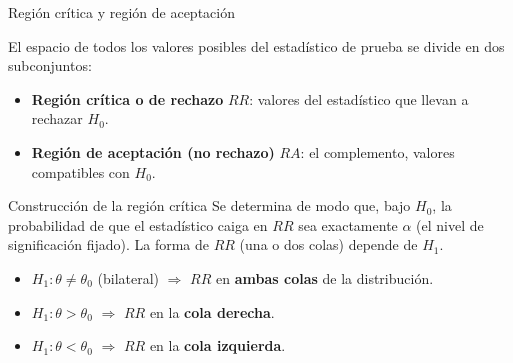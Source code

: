\documentclass[aspectratio=169,11pt]{beamer}
\begin{document}
\begin{frame}{Región crítica y región de aceptación}
\begin{definition}
El espacio de todos los valores posibles del estadístico de prueba se divide en dos subconjuntos:
\begin{itemize}
\item \textbf{Región crítica o de rechazo} $RR$: valores del estadístico que llevan a rechazar $H_0$.
\item \textbf{Región de aceptación (no rechazo)} $RA$: el complemento, valores compatibles con $H_0$.
\end{itemize}
\end{definition}

\begin{block}{Construcción de la región crítica}
Se determina de modo que, bajo $H_0$, la probabilidad de que el estadístico caiga en $RR$ sea exactamente $\alpha$ (el nivel de significación fijado). La forma de $RR$ (una o dos colas) depende de $H_1$.
\end{block}

\begin{itemize}
\item $H_1:\theta\neq\theta_0$ (bilateral) $\Rightarrow$ $RR$ en \textbf{ambas colas} de la distribución.
\item $H_1:\theta>\theta_0$ $\Rightarrow$ $RR$ en la \textbf{cola derecha}.
\item $H_1:\theta<\theta_0$ $\Rightarrow$ $RR$ en la \textbf{cola izquierda}.
\end{itemize}
\end{frame}
\end{document}
